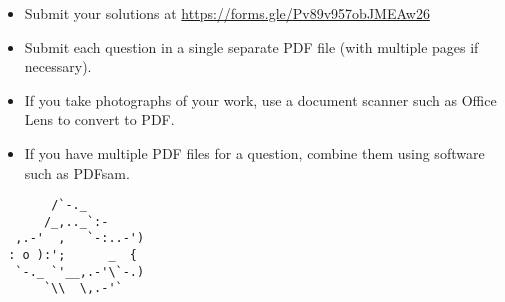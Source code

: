 \documentclass{article}
\begin{document}
\vfill
\small
\begin{itemize}
	\item Submit your solutions at \href{https://forms.gle/Pv89v957obJMEAw26}{https://forms.gle/Pv89v957obJMEAw26}
	\item Submit each question in a single separate PDF file (with multiple pages if necessary).
	\item If you take photographs of your work, use a document scanner such as Office Lens to convert to PDF.
	\item If you have multiple PDF files for a question, combine them using software such as PDFsam.
\end{itemize}

\vfill
\centering
\small
\begin{BVerbatim}
       /`-._
      /_,.._`:-         
  ,.-'  ,   `-:..-')   
 : o ):';      _  {   
  `-._ `'__,.-'\`-.)
      `\\  \,.-'`
\end{BVerbatim}
\end{document}
